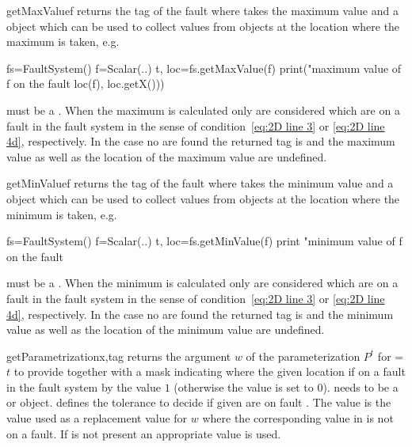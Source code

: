 \begin{methoddesc}[FaultSystem]{getMaxValue}{f}
returns the tag of the fault where  takes the maximum value and a
 object which can be used to collect values from \Data objects
at the location where the maximum is taken, e.g.
\begin{python}
       fs=FaultSystem()
       f=Scalar(..)
       t, loc=fs.getMaxValue(f)
       print("maximum value of f on the fault %
             loc(f), loc.getX()))
\end{python}
 must be a \Scalar. When the maximum is calculated only
\DataSamplePoints are considered which are on a fault in the fault system in
the sense of condition~\ref{eq:2D line 3} or \ref{eq:2D line 4d}, respectively.
In the case no \DataSamplePoints are found the returned tag is  and
the maximum value as well as the location of the maximum value are undefined.
\end{methoddesc}

\begin{methoddesc}[FaultSystem]{getMinValue}{f}
returns the tag of the fault where  takes the minimum value and a
 object which can be used to collect values from \Data objects
at the location where the minimum is taken, e.g.
\begin{python}
  fs=FaultSystem()
  f=Scalar(..)
  t, loc=fs.getMinValue(f)
  print "minimum value of f on the fault %
\end{python}
 must be a \Scalar. When the minimum is calculated only
\DataSamplePoints are considered which are on a fault in the fault system in
the sense of condition~\ref{eq:2D line 3} or \ref{eq:2D line 4d}, respectively.
In the case no \DataSamplePoints are found the returned tag is  and
the minimum value as well as the location of the minimum value are undefined.
\end{methoddesc}

\begin{methoddesc}[FaultSystem]{getParametrization}{x,tag }
returns the argument $w$ of the parameterization $P^t$ for =$t$ to
provide  together with a mask indicating where the given location if on
a fault in the fault system by the value $1$ (otherwise the value is set to $0$).
 needs to be a \Vector or \numpyNDA object.
 defines the tolerance to decide if given \DataSamplePoints are on
fault . The value  is the value used as a replacement
value for $w$ where the corresponding value in  is not on a fault.
If  is not present an appropriate value is used.
\end{methoddesc}
 
